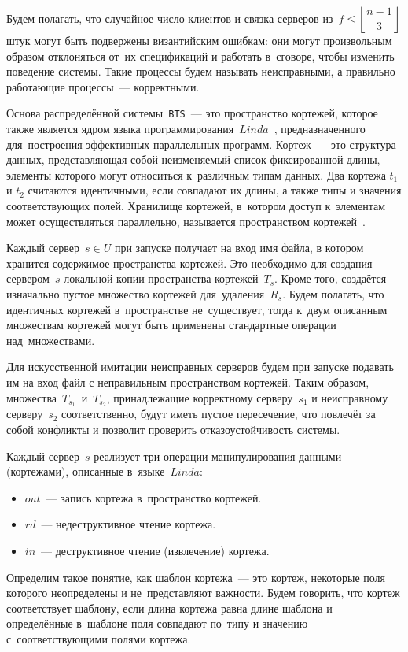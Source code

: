 Будем полагать, что случайное число клиентов и связка серверов из~$f \leqslant \left\lfloor \dfrac{n-1}{3} \right\rfloor$ штук могут быть подвержены византийским ошибкам: они могут произвольным образом отклоняться от~их спецификаций и работать в~сговоре, чтобы изменить поведение системы. Такие процессы будем называть неисправными, а правильно работающие процессы~--- корректными.

Основа распределённой системы~\texttt{BTS}~--- это пространство кортежей, которое также является ядром языка программирования~$Linda$~\autocite{linda}, предназначенного для~построения эффективных параллельных программ. Кортеж~--- это структура данных, представляющая собой неизменяемый список фиксированной длины, элементы которого могут относиться к~различным типам данных. Два кортежа $t_1$ и $t_2$ считаются идентичными, если совпадают их длины, а также типы и значения соответствующих полей. Хранилище кортежей, в~котором доступ к~элементам может осуществляться параллельно, называется пространством кортежей~\autocite{tuplespace}.

Каждый сервер~$s \in U$ при запуске получает на вход имя файла, в котором хранится содержимое пространства кортежей. Это необходимо для создания сервером~$s$ локальной копии пространства кортежей~$T_s$. Кроме того, создаётся изначально пустое множество кортежей для~удаления~$R_s$. Будем полагать, что идентичных кортежей в~пространстве не~существует, тогда к~двум описанным множествам кортежей могут быть применены стандартные операции над~множествами.

Для искусственной имитации неисправных серверов будем при запуске подавать им на вход файл с неправильным пространством кортежей. Таким образом, множества~$T_{s_1}$~и~$T_{s_2}$, принадлежащие корректному серверу~$s_1$ и неисправному серверу~$s_2$ соответственно, будут иметь пустое пересечение, что повлечёт за собой конфликты и позволит проверить отказоустойчивость системы.

Каждый сервер~$s$ реализует три операции манипулирования данными (кортежами), описанные в~языке~$Linda$:
\begin{itemize}
	\item $out$~--- запись кортежа в~пространство кортежей.
	\item $rd$~--- недеструктивное чтение кортежа.
	\item $in$~--- деструктивное чтение (извлечение) кортежа.
\end{itemize}
Определим такое понятие, как шаблон кортежа~--- это кортеж, некоторые поля которого неопределены и не~представляют важности. Будем говорить, что кортеж соответствует шаблону, если длина кортежа равна длине шаблона и определённые в~шаблоне поля совпадают по~типу и значению с~соответствующими полями кортежа.

